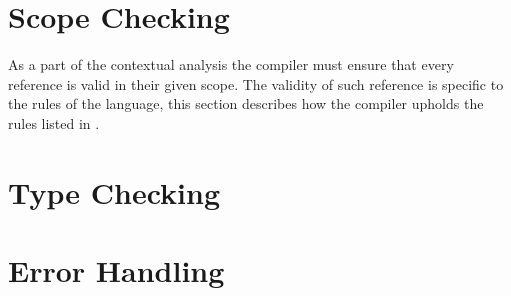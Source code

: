 \section{Scope Checking}
As a part of the contextual analysis the compiler must ensure that every reference is valid in their given scope.
The validity of such reference is specific to the rules of the language, this section describes how the compiler upholds the rules listed in .


\section{Type Checking}


\section{Error Handling}





